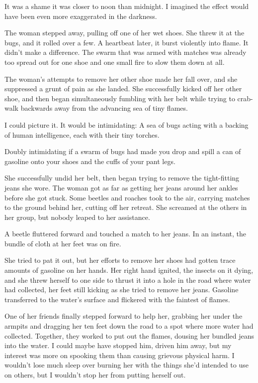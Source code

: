 It was a shame it was closer to noon than midnight.  I imagined the effect would have been even more exaggerated in the darkness.



The woman stepped away, pulling off one of her wet shoes.  She threw it at the bugs, and it rolled over a few.  A heartbeat later, it burst violently into flame.  It didn't make a difference.  The swarm that was armed with matches was already too spread out for one shoe and one small fire to slow them down at all.



The woman's attempts to remove her other shoe made her fall over, and she suppressed a grunt of pain as she landed.  She successfully kicked off her other shoe, and then began simultaneously fumbling with her belt while trying to crab-walk backwards away from the advancing sea of tiny flames.



I could picture it.  It would be intimidating:  A sea of bugs acting with a backing of human intelligence, each with their tiny torches.



Doubly intimidating if a swarm of bugs had made you drop and spill a can of gasoline onto your shoes and the cuffs of your pant legs.



She successfully undid her belt, then began trying to remove the tight-fitting jeans she wore.  The woman got as far as getting her jeans around her ankles before she got stuck.  Some beetles and roaches took to the air, carrying matches to the ground behind her, cutting off her retreat.  She screamed at the others in her group, but nobody leaped to her assistance.



A beetle fluttered forward and touched a match to her jeans.  In an instant, the bundle of cloth at her feet was on fire.



She tried to pat it out, but her efforts to remove her shoes had gotten trace amounts of gasoline on her hands.  Her right hand ignited, the insects on it dying, and she threw herself to one side to thrust it into a hole in the road where water had collected, her feet still kicking as she tried to remove her jeans.  Gasoline transferred to the water's surface and flickered with the faintest of flames.



One of her friends finally stepped forward to help her, grabbing her under the armpits and dragging her ten feet down the road to a spot where more water had collected.  Together, they worked to put out the flames, dousing her bundled jeans into the water.  I could maybe have stopped him, driven him away, but my interest was more on spooking them than causing grievous physical harm.  I wouldn't lose much sleep over burning her with the things she'd intended to use on others, but I wouldn't stop her from putting herself out.




